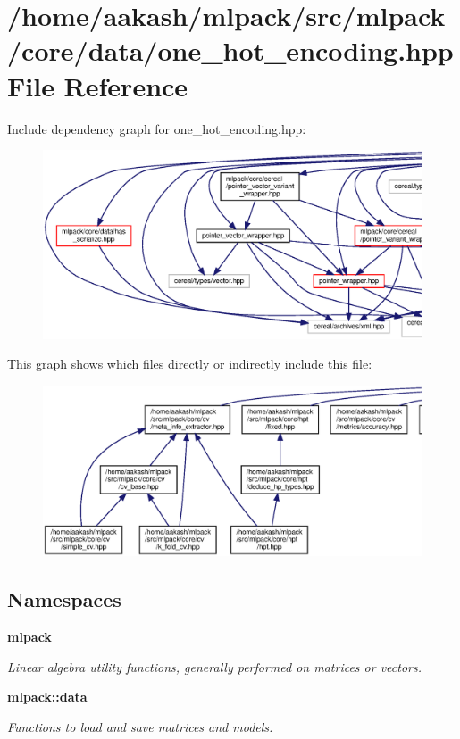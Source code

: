 \section{/home/aakash/mlpack/src/mlpack/core/data/one\+\_\+hot\+\_\+encoding.hpp File Reference}
\label{one__hot__encoding_8hpp}
Include dependency graph for one\+\_\+hot\+\_\+encoding.\+hpp\+:
\nopagebreak
\begin{figure}[H]
\begin{center}
\leavevmode
\includegraphics[width=350pt]{one__hot__encoding_8hpp__incl}
\end{center}
\end{figure}
This graph shows which files directly or indirectly include this file\+:
\nopagebreak
\begin{figure}[H]
\begin{center}
\leavevmode
\includegraphics[width=350pt]{one__hot__encoding_8hpp__dep__incl}
\end{center}
\end{figure}
\subsection*{Namespaces}
\begin{DoxyCompactItemize}
\item 
 \textbf{ mlpack}
\begin{DoxyCompactList}\small\item\em Linear algebra utility functions, generally performed on matrices or vectors. \end{DoxyCompactList}\item 
 \textbf{ mlpack\+::data}
\begin{DoxyCompactList}\small\item\em Functions to load and save matrices and models. \end{DoxyCompactList}\end{DoxyCompactItemize}
